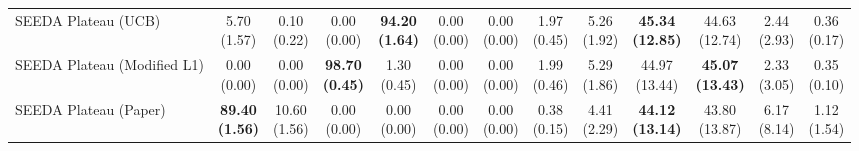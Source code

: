\begin{table}[H]
{\begin{tabular}{l|cccccc|cccccc}
SEEDA Plateau (UCB) & \makecell{5.70 \\ (1.57)} & \makecell{0.10 \\ (0.22)} & {\cellcolor[HTML]{C8E6C9}} \makecell{0.00 \\ (0.00)} & \bfseries \makecell{94.20 \\ (1.64)} & \makecell{0.00 \\ (0.00)} & \makecell{0.00 \\ (0.00)} & \makecell{1.97 \\ (0.45)} & \makecell{5.26 \\ (1.92)} & {\cellcolor[HTML]{C8E6C9}} \bfseries \makecell{45.34 \\ (12.85)} & \makecell{44.63 \\ (12.74)} & \makecell{2.44 \\ (2.93)} & \makecell{0.36 \\ (0.17)} \\
SEEDA Plateau (Modified L1) & \makecell{0.00 \\ (0.00)} & \makecell{0.00 \\ (0.00)} & {\cellcolor[HTML]{C8E6C9}} \bfseries \makecell{98.70 \\ (0.45)} & \makecell{1.30 \\ (0.45)} & \makecell{0.00 \\ (0.00)} & \makecell{0.00 \\ (0.00)} & \makecell{1.99 \\ (0.46)} & \makecell{5.29 \\ (1.86)} & {\cellcolor[HTML]{C8E6C9}} \makecell{44.97 \\ (13.44)} & \bfseries \makecell{45.07 \\ (13.43)} & \makecell{2.33 \\ (3.05)} & \makecell{0.35 \\ (0.10)} \\
SEEDA Plateau (Paper) & \bfseries \makecell{89.40 \\ (1.56)} & \makecell{10.60 \\ (1.56)} & {\cellcolor[HTML]{C8E6C9}} \makecell{0.00 \\ (0.00)} & \makecell{0.00 \\ (0.00)} & \makecell{0.00 \\ (0.00)} & \makecell{0.00 \\ (0.00)} & \makecell{0.38 \\ (0.15)} & \makecell{4.41 \\ (2.29)} & {\cellcolor[HTML]{C8E6C9}} \bfseries \makecell{44.12 \\ (13.14)} & \makecell{43.80 \\ (13.87)} & \makecell{6.17 \\ (8.14)} & \makecell{1.12 \\ (1.54)} \\
\bottomrule
\end{tabular}
}%
\end{table}
